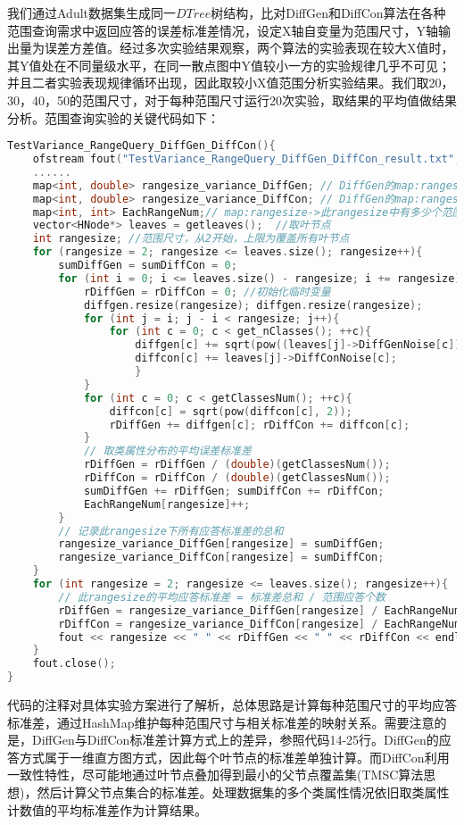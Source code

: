 我们通过Adult数据集生成同一$DTree$树结构，比对DiffGen和DiffCon算法在各种范围查询需求中返回应答的误差标准差情况，设定X轴自变量为范围尺寸，Y轴输出量为误差方差值。经过多次实验结果观察，两个算法的实验表现在较大X值时，其Y值处在不同量级水平，在同一散点图中Y值较小一方的实验规律几乎不可见；并且二者实验表现规律循环出现，因此取较小X值范围分析实验结果。我们取20，30，40，50的范围尺寸，对于每种范围尺寸运行20次实验，取结果的平均值做结果分析。范围查询实验的关键代码如下：
\begin{lstlisting}[language={C++}, caption={范围查询实验}]
TestVariance_RangeQuery_DiffGen_DiffCon(){
	ofstream fout("TestVariance_RangeQuery_DiffGen_DiffCon_result.txt", ios::app);
	......
	map<int, double> rangesize_variance_DiffGen; // DiffGen的map:rangesize->标准差总和
	map<int, double> rangesize_variance_DiffCon; // DiffGen的map:rangesize->标准差总和
	map<int, int> EachRangeNum;// map:rangesize->此rangesize中有多少个范围应答标准差相加
	vector<HNode*> leaves = getleaves();  //取叶节点
	int rangesize; //范围尺寸，从2开始，上限为覆盖所有叶节点
	for (rangesize = 2; rangesize <= leaves.size(); rangesize++){
		sumDiffGen = sumDiffCon = 0;
		for (int i = 0; i <= leaves.size() - rangesize; i += rangesize){
			rDiffGen = rDiffCon = 0; //初始化临时变量
			diffgen.resize(rangesize); diffgen.resize(rangesize);
			for (int j = i; j - i < rangesize; j++){
				for (int c = 0; c < get_nClasses(); ++c){
					diffgen[c] += sqrt(pow((leaves[j]->DiffGenNoise[c]), 2));
					diffcon[c] += leaves[j]->DiffConNoise[c];
					}	
			}
			for (int c = 0; c < getClassesNum(); ++c){
				diffcon[c] = sqrt(pow(diffcon[c], 2));
				rDiffGen += diffgen[c]; rDiffCon += diffcon[c];
			}
			// 取类属性分布的平均误差标准差
			rDiffGen = rDiffGen / (double)(getClassesNum());
			rDiffCon = rDiffCon / (double)(getClassesNum());
			sumDiffGen += rDiffGen;	sumDiffCon += rDiffCon;
			EachRangeNum[rangesize]++;
		}
		// 记录此rangesize下所有应答标准差的总和
		rangesize_variance_DiffGen[rangesize] = sumDiffGen;
		rangesize_variance_DiffCon[rangesize] = sumDiffCon;
	}
	for (int rangesize = 2; rangesize <= leaves.size(); rangesize++){
		// 此rangesize的平均应答标准差 = 标准差总和 / 范围应答个数
		rDiffGen = rangesize_variance_DiffGen[rangesize] / EachRangeNum[rangesize];
		rDiffCon = rangesize_variance_DiffCon[rangesize] / EachRangeNum[rangesize];
		fout << rangesize << " " << rDiffGen << " " << rDiffCon << endl; // 写入文件
	}
	fout.close();
}
\end{lstlisting}
代码的注释对具体实验方案进行了解析，总体思路是计算每种范围尺寸的平均应答标准差，通过HashMap维护每种范围尺寸与相关标准差的映射关系。需要注意的是，DiffGen与DiffCon标准差计算方式上的差异，参照代码14-25行。DiffGen的应答方式属于一维直方图方式，因此每个叶节点的标准差单独计算。而DiffCon利用一致性特性，尽可能地通过叶节点叠加得到最小的父节点覆盖集(TMSC算法思想)，然后计算父节点集合的标准差。处理数据集的多个类属性情况依旧取类属性计数值的平均标准差作为计算结果。


